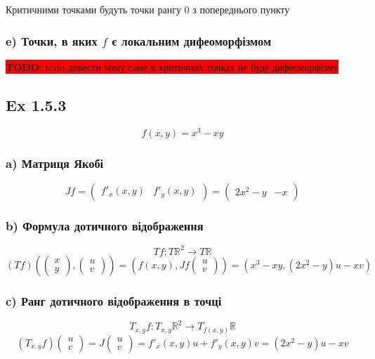 \documentclass[10pt, a4paper]{article} %
\newcommand{\R}{\mathbb{R}}
\newcommand{\J}{J}
\newcommand{\todo}[1]{\colorbox{red}{\textbf{TODO}: #1}}
\begin{document}
Критичними точками будуть точки рангу 0 з попереднього пункту

\subsubsection*{e) Точки, в яких $f$ є локальним дифеоморфізмом}
\todo{todo довести чому саме в критичних точках не буде дифеоморфізму}


\subsection*{Ex 1.5.3}
\begin{mdframed}
    \[f(x,y) = x^3 - xy\]
\end{mdframed}

\subsubsection*{a) Матриця Якобі}
\[\J f = \begin{pmatrix}
    f'_x(x,y) & f'_y(x,y)
\end{pmatrix} = \begin{pmatrix}
    2x^2-y & -x
\end{pmatrix}\]

\subsubsection*{b) Формула дотичного відображення}
\[Tf : T\R^2 \to T\R\]
\[(Tf)\left(\begin{pmatrix} x \\ y \end{pmatrix}, \begin{pmatrix} u \\ v \end{pmatrix}\right) 
= \left(f(x,y),\J f \begin{pmatrix} u \\ v \end{pmatrix}\right) 
= \left(x^3 - xy, (2x^2-y)u - xv\right)\]

\subsubsection*{c) Ранг дотичного відображення в точці}
\[T_{x,y} f : T_{x,y}\R^2 \to T_{f(x,y)}\R\]
\[(T_{x,y} f) \begin{pmatrix} u \\ v \end{pmatrix}
= J\begin{pmatrix} u \\ v \end{pmatrix} = f'_x(x,y) u + f'_y(x,y) v = (2x^2-y)u - xv\]
\end{document}
